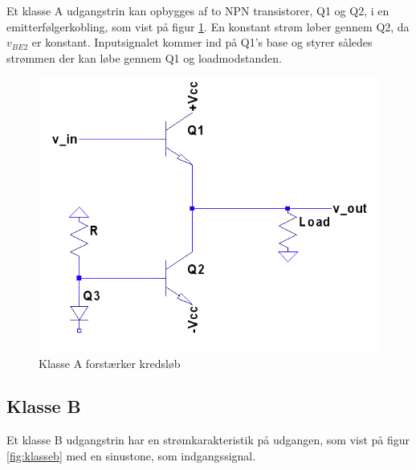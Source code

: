 Et klasse A udgangstrin kan opbygges af to NPN transistorer, Q1 og Q2, i en emitterfølgerkobling, som vist på figur \ref{fig:classa}. En konstant strøm løber gennem Q2, da $v_{BE2}$ er konstant. Inputsignalet kommer ind på Q1's base og styrer således strømmen der kan løbe gennem Q1 og loadmodstanden. 

\begin{figure}[h]
\centering
\includegraphics[scale=.35]{indledende_analyse/klasser/classa.png}
\caption{Klasse A forstærker kredsløb}
\label{fig:classa}
\end{figure}



\subsection{Klasse B}

Et klasse B udgangstrin har en strømkarakteristik på udgangen, som vist på figur \ref{fig:klasseb} med en sinustone, som indgangssignal. 

